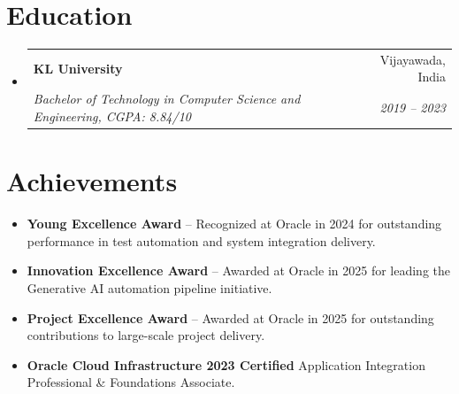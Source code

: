 \documentclass[letterpaper,11pt]{article}
\makeatletter
\newcommand{\resumeItem}[1]{
  \item\small{
    {#1 \vspace{-2pt}}
  }
}
\newcommand{\resumeSubheading}[4]{
  \vspace{-2pt}\item
    \begin{tabular*}{0.97\textwidth}[t]{l@{\extracolsep{\fill}}r}
      \textbf{#1} & #2 \\
      \textit{\small#3} & \textit{\small #4} \\
    \end{tabular*}\vspace{-7pt}
}
\newcommand{\resumeSubHeadingListStart}{\begin{itemize}[leftmargin=0.15in, label={}]}
\newcommand{\resumeSubHeadingListEnd}{\end{itemize}}
\newcommand{\resumeItemListStart}{\begin{itemize}}
\newcommand{\resumeItemListEnd}{\end{itemize}\vspace{-5pt}}
\makeatother
\begin{document}
\section{Education}
\resumeSubHeadingListStart
    \resumeSubheading
        {KL University}{Vijayawada, India}
        {Bachelor of Technology in Computer Science and Engineering, CGPA: 8.84/10}{2019 -- 2023}
\resumeSubHeadingListEnd

\section{Achievements}
\resumeItemListStart
    \resumeItem{\textbf{Young Excellence Award} -- Recognized at Oracle in 2024 for outstanding performance in test automation and system integration delivery.}
    \resumeItem{\textbf{Innovation Excellence Award} -- Awarded at Oracle in 2025 for leading the Generative AI automation pipeline initiative.}
    \resumeItem{\textbf{Project Excellence Award} -- Awarded at Oracle in 2025 for outstanding contributions to large-scale project delivery.}
    \resumeItem{\textbf{Oracle Cloud Infrastructure 2023 Certified} Application Integration Professional \& Foundations Associate.}
\resumeItemListEnd
\end{document}
